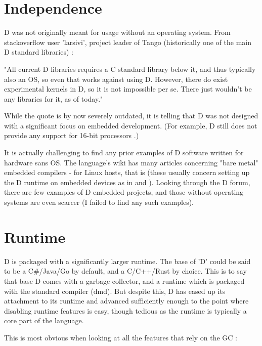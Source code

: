 \documentclass[letterpaper,twocolumn,10pt]{article}
\begin{document}
\section*{Independence}

D was not originally meant for usage without an operating system.  From
stackoverflow user 'larsivi', project leader of Tango (historically one of 
the main D standard libraries) \cite{larsivi}:

\begin{displayquote}
    "All current D libraries requires a C standard library below it, and thus typically also an OS, so even that works against using D. However, there do exist experimental kernels in D, so it is not impossible per se. There just wouldn't be any libraries for it, as of today."
\end{displayquote}

While the quote is by now severely outdated, it is telling that D was not designed
with a significant focus on embedded development.  (For example, D still 
does not provide any support for 16-bit processors \cite{overview}.)

It is actually challenging to find any prior examples of D software written
for hardware sans OS.  The language's wiki has many articles concerning "bare
metal" embedded compilers - for Linux hosts, that is (these usually concern
setting up the D runtime on embedded devices as in \cite{baremetal1} and 
\cite{baremetal2}).  Looking through the D forum, 
there are few examples of D embedded projects, and those without 
operating systems are even scarcer (I failed to find any such examples).


\section*{Runtime}

D is packaged with a significantly larger runtime.  The base of 'D' could be said
to be a C\#/Java/Go by default, and a C/C++/Rust by choice.  This is to say that
base D comes with a garbage collector, and a runtime which is packaged with the
standard compiler (dmd).  But despite this, D has eased up its attachment
to its runtime \cite{20790} and advanced sufficiently 
enough to the point where disabling runtime features is easy, 
though tedious as the runtime is typically a core part of the language.

This is most obvious when looking at all the features that rely on the GC
\cite{garbage}:
\end{document}
